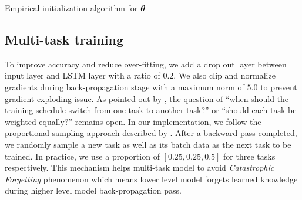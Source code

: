 \documentclass[sigconf,anonymous,review]{acmart}
\renewcommand{\citename}{\citet}
\begin{document}
\begin{algorithm}[h]
  \begin{algorithmic}[1]
       
    \ENDIF
    \ENDFOR
     
  \end{algorithmic}
  \caption{\label{alg:init_theta} Empirical initialization
    algorithm for $\boldsymbol{\theta}$}
\end{algorithm}

\subsection{Multi-task training}
\label{sec:multi_train}

To improve accuracy and reduce over-fitting, we add a drop out
layer between input layer and LSTM layer with a ratio of $0.2$.
We also clip and normalize gradients during back-propagation
stage with a maximum norm of $5.0$ to prevent gradient exploding
issue. As pointed out by \citename{lample2016neural}, the
question of ``when should the training schedule switch from one
task to another task?'' or ``should each task be weighted
equally?'' remains open. In our implementation, we follow the
proportional sampling approach described by
\citename{sogaard2016deep}. After a backward pass completed, we
randomly sample a new task as well as its batch data as the next
task to be trained. In practice, we use a proportion of
$[0.25,0.25,0.5]$ for three tasks respectively. This mechanism
helps multi-task model to avoid \emph{Catastrophic Forgetting}
phenomenon which means lower level model forgets learned
knowledge during higher level model back-propagation pass.
\end{document}
